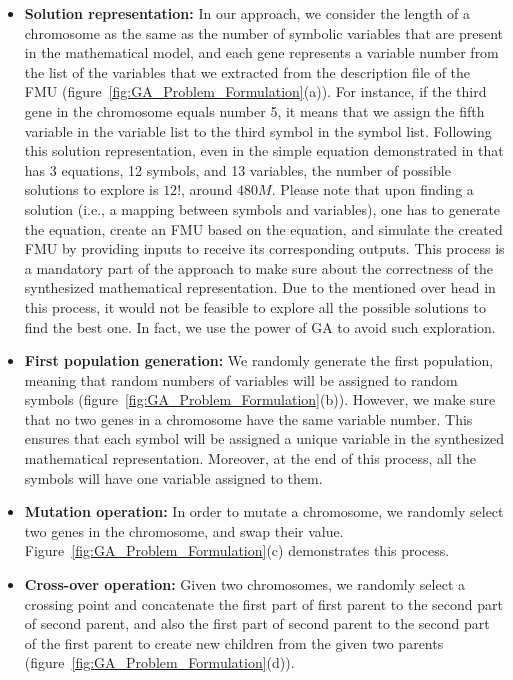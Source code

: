 \begin{itemize}
    \item \textbf{Solution representation:} 
 In our approach, we consider the length of a chromosome as the same as the number of symbolic variables that are present in the mathematical model, and each gene represents a variable number from the list of the variables that we extracted from the description file of the FMU (figure~\ref{fig:GA_Problem_Formulation}(a)). For instance, if the third gene in the chromosome equals number 5, it means that we assign the fifth variable in the variable list to the third symbol in the symbol list. Following this solution representation, even in the simple equation demonstrated in  that has 3 equations, 12 symbols, and 13 variables, the number of possible solutions to explore is $12!$, around $480M$. Please note that upon finding a solution (i.e., a mapping between symbols and variables), one has to generate the equation, create an FMU based on the equation, and simulate the created FMU by providing inputs to receive its corresponding outputs. This process is a mandatory part of the approach to make sure about the correctness of the synthesized mathematical representation. Due to the mentioned over head in this process, it would not be feasible to explore all the possible solutions to find the best one. In fact, we use the power of GA to avoid such exploration.     
    
    \item \textbf{First population generation:} We randomly generate the first population, meaning that random numbers of variables will be assigned to random symbols (figure~\ref{fig:GA_Problem_Formulation}(b)). However, we make sure that no two genes in a chromosome have the same variable number. This ensures that each symbol will be assigned a unique variable in the synthesized mathematical representation. Moreover, at the end of this process, all the symbols will have one variable assigned to them. 

    \item \textbf{Mutation operation:}
    In order to mutate a chromosome, we randomly select two genes in the chromosome, and swap their value. Figure~\ref{fig:GA_Problem_Formulation}(c) demonstrates this process. 
    
    \item \textbf{Cross-over operation:}
    Given two chromosomes, we randomly select a crossing point and concatenate the first part of first parent to the second part of second parent, and also the first part of second parent to the second part of the first parent to create new children from the given two parents (figure~\ref{fig:GA_Problem_Formulation}(d)). 
    

\end{itemize}
